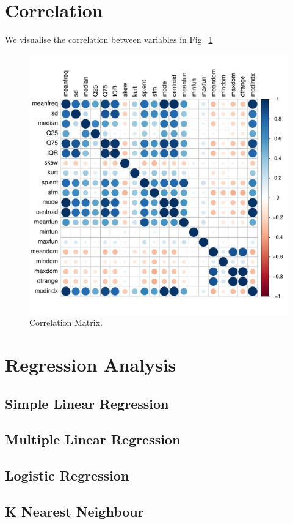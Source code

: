 \documentclass{article}
\begin{document}
	
	\section{Correlation}
	We visualise the correlation between variables in Fig.~\ref{correlation_matrix}
	\begin{figure}
		\centering
		\includegraphics[width=\textwidth]{graphs/correlation_matrix.pdf}
		\caption{Correlation Matrix.}
		\label{correlation_matrix}
	\end{figure}
	
	\section{Regression Analysis}
	\subsection{Simple Linear Regression}
	\subsection{Multiple Linear Regression}
	\subsection{Logistic Regression}
	\subsection{K Nearest Neighbour}
	
\end{document}
